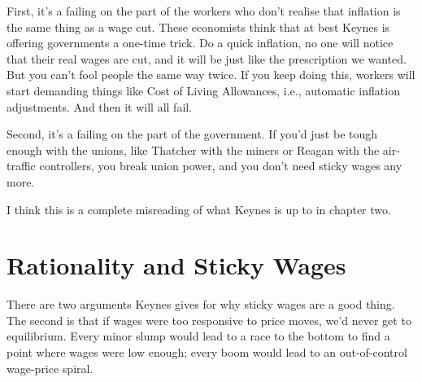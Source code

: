 \documentclass[
  11pt,
  letterpaper,
  DIV=11,
  numbers=noendperiod,
  oneside]{scrartcl}
\begin{document}
First, it's a failing on the part of the workers who don't realise that
inflation is the same thing as a wage cut. These economists think that
at best Keynes is offering governments a one-time trick. Do a quick
inflation, no one will notice that their real wages are cut, and it will
be just like the prescription we wanted. But you can't fool people the
same way twice. If you keep doing this, workers will start demanding
things like Cost of Living Allowances, i.e., automatic inflation
adjustments. And then it will all fail.

Second, it's a failing on the part of the government. If you'd just be
tough enough with the unions, like Thatcher with the miners or Reagan
with the air-traffic controllers, you break union power, and you don't
need sticky wages any more.

I think this is a complete misreading of what Keynes is up to in chapter
two.

\section{Rationality and Sticky
Wages}\label{rationality-and-sticky-wages}

There are two arguments Keynes gives for why sticky wages are a good
thing. The second is that if wages were too responsive to
price moves, we'd never get to equilibrium. Every minor slump would lead
to a race to the bottom to find a point where wages were low enough;
every boom would lead to an out-of-control wage-price spiral.
\end{document}
